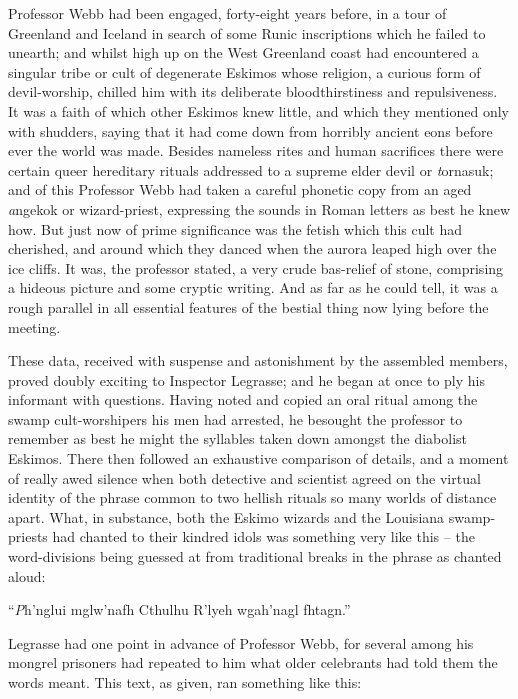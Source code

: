 Professor Webb had been engaged, forty-eight years before, in a tour of Greenland and Iceland in search of some Runic inscriptions which he failed to unearth; and whilst high up on the West Greenland coast had encountered a singular tribe or cult of degenerate Eskimos whose religion, a curious form of devil-worship, chilled him with its deliberate bloodthirstiness and repulsiveness. It was a faith of which other Eskimos knew little, and which they mentioned only with shudders, saying that it had come down from horribly ancient eons before ever the world was made. Besides nameless rites and human sacrifices there were certain queer hereditary rituals addressed to a supreme elder devil or {\emph tornasuk}; and of this Professor Webb had taken a careful phonetic copy from an aged {\emph angekok} or wizard-priest, expressing the sounds in Roman letters as best he knew how. But just now of prime significance was the fetish which this cult had cherished, and around which they danced when the aurora leaped high over the ice cliffs. It was, the professor stated, a very crude bas-relief of stone, comprising a hideous picture and some cryptic writing. And as far as he could tell, it was a rough parallel in all essential features of the bestial thing now lying before the meeting.

These data, received with suspense and astonishment by the assembled members, proved doubly exciting to Inspector Legrasse; and he began at once to ply his informant with questions. Having noted and copied an oral ritual among the swamp cult-worshipers his men had arrested, he besought the professor to remember as best he might the syllables taken down amongst the diabolist Eskimos. There then followed an exhaustive comparison of details, and a moment of really awed silence when both detective and scientist agreed on the virtual identity of the phrase common to two hellish rituals so many worlds of distance apart. What, in substance, both the Eskimo wizards and the Louisiana swamp-priests had chanted to their kindred idols was something very like this⁠ – the word-divisions being guessed at from traditional breaks in the phrase as chanted aloud:

\beginblockquote
“{\emph Ph’nglui mglw’nafh Cthulhu R’lyeh wgah’nagl fhtagn.}”
\endblockquote

Legrasse had one point in advance of Professor Webb, for several among his mongrel prisoners had repeated to him what older celebrants had told them the words meant. This text, as given, ran something like this:

